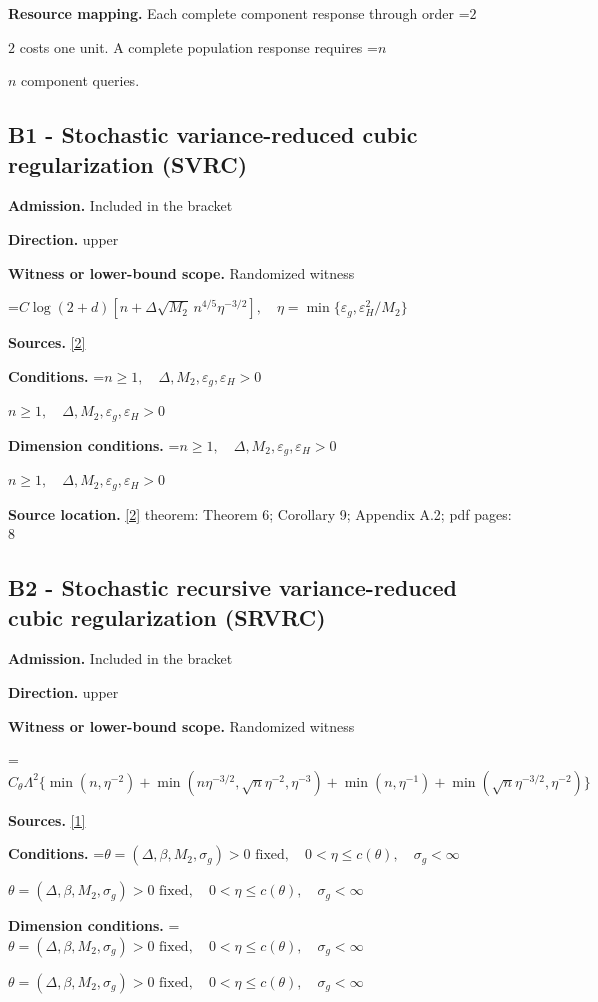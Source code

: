 \documentclass[10pt,a4paper]{article}
\newcommand{\AtlasMath}[1]{\par\begingroup\centering\setbox0=\hbox{$\displaystyle #1$}\ifdim\wd0>1.4\linewidth\typeout{ATLAS WIDE FORMULA: \the\wd0}\fi\ifdim\wd0>\linewidth\resizebox{\linewidth}{!}{\box0}\else\box0\fi\par\endgroup}
\newcommand{\AtlasInlineMath}[1]{\begingroup\setbox0=\hbox{$#1$}\ifdim\wd0>.4\linewidth\endgroup\AtlasMath{#1}\else\endgroup$#1$\fi}
\begin{document}
\textbf{Resource mapping.} Each complete component response through order \AtlasInlineMath{2} costs one unit. A complete population response requires \AtlasInlineMath{n} component queries.

\subsection{B1 - Stochastic variance-reduced cubic regularization (SVRC)}
\textbf{Admission.} Included in the bracket

\textbf{Direction.} upper

\textbf{Witness or lower-bound scope.} Randomized witness

\AtlasMath{C\log(2+d)[n+\Delta\sqrt{M_2}\,n^{4/5}\eta^{-3/2}],\quad\eta=\min\{\varepsilon_g,\varepsilon_H^2/M_2\}}
\textbf{Sources.} \href{https://jmlr.org/papers/volume20/19-055/19-055.pdf}{[2]}

\textbf{Conditions.} \AtlasInlineMath{n\ge1,\quad\Delta,M_2,\varepsilon_g,\varepsilon_H>0}

\textbf{Dimension conditions.} \AtlasInlineMath{n\ge1,\quad\Delta,M_2,\varepsilon_g,\varepsilon_H>0}

\textbf{Source location.} \href{https://jmlr.org/papers/volume20/19-055/19-055.pdf}{[2]} theorem: Theorem 6; Corollary 9; Appendix A.2; pdf pages: 8

\subsection{B2 - Stochastic recursive variance-reduced cubic regularization (SRVRC)}
\textbf{Admission.} Included in the bracket

\textbf{Direction.} upper

\textbf{Witness or lower-bound scope.} Randomized witness

\AtlasMath{C_\theta\Lambda^2\{\min(n,\eta^{-2})+\min(n\eta^{-3/2},\sqrt n\eta^{-2},\eta^{-3})+\min(n,\eta^{-1})+\min(\sqrt n\eta^{-3/2},\eta^{-2})\}}
\textbf{Sources.} \href{https://proceedings.mlr.press/v108/zhou20a/zhou20a.pdf}{[1]}

\textbf{Conditions.} \AtlasInlineMath{\theta=(\Delta,\beta,M_2,\sigma_g)>0\text{ fixed},\quad0<\eta\le c(\theta),\quad\sigma_g<\infty}

\textbf{Dimension conditions.} \AtlasInlineMath{\theta=(\Delta,\beta,M_2,\sigma_g)>0\text{ fixed},\quad0<\eta\le c(\theta),\quad\sigma_g<\infty}
\end{document}
